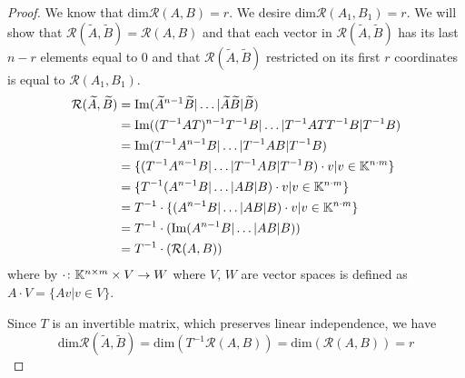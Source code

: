 \begin{proof}
	We know that $\text{dim}\mathcal{R}(A,B)=r$. We desire $\text{dim}\mathcal{R}(A_1,B_1)=r$. We will show that $\mathcal{R}(\widetilde{A},\widetilde{B})=\mathcal{R}(A,B)$ and that each vector in $\mathcal{R}(\widetilde{A},\widetilde{B})$ has its last $n-r$ elements equal to 0 and that $\mathcal{R}(\widetilde{A},\widetilde{B})$ restricted on its first $r$ coordinates is equal to $\mathcal{R}(A_1,B_1)$. 
	\begin{align*}
		\mathcal{R}(\widetilde{A},\widetilde{B})&=\text{Im}(\widetilde{A}^{n-1}\widetilde{B}|\ldots|\widetilde{A}\widetilde{B}|\widetilde{B}) \\
		&=\text{Im}((T^{-1}AT)^{n-1}T^{-1}B|\ldots|T^{-1}ATT^{-1}B|T^{-1}B) \\
		&=\text{Im}(T^{-1}A^{n-1}B|\ldots|T^{-1}AB|T^{-1}B) \\
		&=\{(T^{-1}A^{n-1}B|\ldots|T^{-1}AB|T^{-1}B)\cdot v | v \in \mathbb{K}^{n\cdot m}\} \\
		&=\{T^{-1}(A^{n-1}B|\ldots|AB|B)\cdot v | v \in \mathbb{K}^{n\cdot m}\} \\
		&=T^{-1}\cdot\{(A^{n-1}B|\ldots|AB|B)\cdot v | v \in \mathbb{K}^{n\cdot m}\} \\
		&=T^{-1}\cdot(\text{Im}(A^{n-1}B|\ldots|AB|B)) \\
		&=T^{-1}\cdot(\mathcal{R}(A,B))
	\end{align*}
	where by $\cdot\colon\mathbb{K}^{n\times m}\times V\rightarrow W$ where $V$, $W$ are vector spaces is defined as $A\cdot V=\{Av|v\in V\}$.

	Since $T$ is an invertible matrix, which preserves linear independence, we have $$\text{dim}\mathcal{R}(\widetilde{A},\widetilde{B})=\text{dim}(T^{-1}\mathcal{R}(A,B))=\text{dim}(\mathcal{R}(A,B))=r$$


\end{proof}

